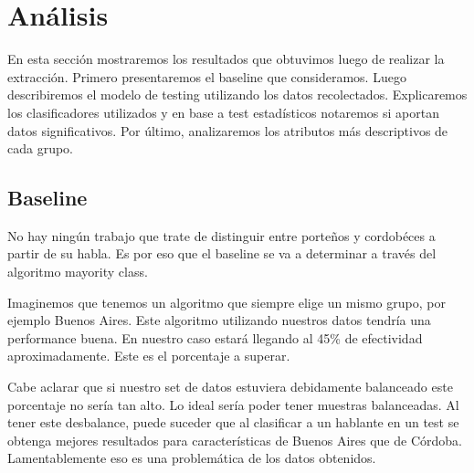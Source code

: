\chapter{Análisis}

En esta sección mostraremos los resultados que obtuvimos luego de realizar la extracción. Primero presentaremos el baseline que consideramos. Luego describiremos el modelo de testing utilizando los datos recolectados. Explicaremos los clasificadores utilizados y en base a test estadísticos notaremos si aportan datos significativos. Por último, analizaremos los atributos más descriptivos de cada grupo.

\section{Baseline}

No hay ningún trabajo que trate de distinguir entre porteños y cordobéces a partir de su habla. Es por eso que el baseline se va a determinar a través del algoritmo mayority class.

Imaginemos que tenemos un algoritmo que siempre elige un mismo grupo, por ejemplo Buenos Aires. Este algoritmo utilizando nuestros datos tendría una performance buena. En nuestro caso estará llegando al 45\% de efectividad aproximadamente. Este es el porcentaje a superar. 



Cabe aclarar que si nuestro set de datos estuviera debidamente balanceado este porcentaje no sería tan alto. Lo ideal sería poder tener muestras balanceadas. Al tener este desbalance, puede suceder que al clasificar a un hablante en un test se obtenga mejores resultados para características de Buenos Aires que de Córdoba. Lamentablemente eso es una problemática de los datos obtenidos.

